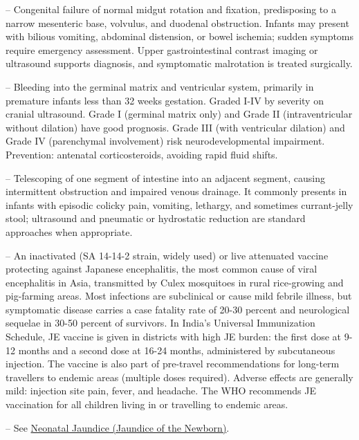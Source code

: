 -- Congenital failure of normal midgut rotation and fixation, predisposing to a narrow mesenteric base, volvulus, and duodenal obstruction. Infants may present with bilious vomiting, abdominal distension, or bowel ischemia; sudden symptoms require emergency assessment. Upper gastrointestinal contrast imaging or ultrasound supports diagnosis, and symptomatic malrotation is treated surgically.

-- Bleeding into the germinal matrix and ventricular system, primarily in premature infants less than 32 weeks gestation. Graded I-IV by severity on cranial ultrasound. Grade I (germinal matrix only) and Grade II (intraventricular without dilation) have good prognosis. Grade III (with ventricular dilation) and Grade IV (parenchymal involvement) risk neurodevelopmental impairment. Prevention: antenatal corticosteroids, avoiding rapid fluid shifts.

-- Telescoping of one segment of intestine into an adjacent segment, causing intermittent obstruction and impaired venous drainage. It commonly presents in infants with episodic colicky pain, vomiting, lethargy, and sometimes currant-jelly stool; ultrasound and pneumatic or hydrostatic reduction are standard approaches when appropriate.

-- An inactivated (SA 14-14-2 strain, widely used) or live attenuated vaccine protecting against Japanese encephalitis, the most common cause of viral encephalitis in Asia, transmitted by Culex mosquitoes in rural rice-growing and pig-farming areas. Most infections are subclinical or cause mild febrile illness, but symptomatic disease carries a case fatality rate of 20-30 percent and neurological sequelae in 30-50 percent of survivors. In India's Universal Immunization Schedule, JE vaccine is given in districts with high JE burden: the first dose at 9-12 months and a second dose at 16-24 months, administered by subcutaneous injection. The vaccine is also part of pre-travel recommendations for long-term travellers to endemic areas (multiple doses required). Adverse effects are generally mild: injection site pain, fever, and headache. The WHO recommends JE vaccination for all children living in or travelling to endemic areas.

-- See \hyperlink{Neonatal Jaundice (Jaundice of the Newborn)}{Neonatal Jaundice (Jaundice of the Newborn)}.

